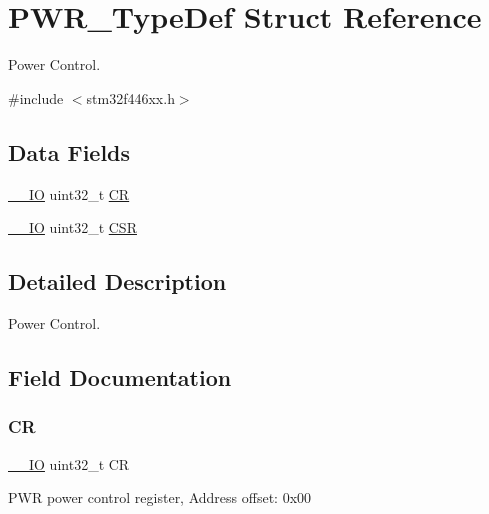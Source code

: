 \hypertarget{struct_p_w_r___type_def}{}\section{P\+W\+R\+\_\+\+Type\+Def Struct Reference}
\label{struct_p_w_r___type_def}


Power Control.  




{\ttfamily \#include $<$stm32f446xx.\+h$>$}

\subsection*{Data Fields}
\begin{DoxyCompactItemize}
\item 
\mbox{\hyperlink{core__sc300_8h_aec43007d9998a0a0e01faede4133d6be}{\+\_\+\+\_\+\+IO}} uint32\+\_\+t \mbox{\hyperlink{struct_p_w_r___type_def_ab40c89c59391aaa9d9a8ec011dd0907a}{CR}}
\item 
\mbox{\hyperlink{core__sc300_8h_aec43007d9998a0a0e01faede4133d6be}{\+\_\+\+\_\+\+IO}} uint32\+\_\+t \mbox{\hyperlink{struct_p_w_r___type_def_a876dd0a8546697065f406b7543e27af2}{C\+SR}}
\end{DoxyCompactItemize}


\subsection{Detailed Description}
Power Control. 

\subsection{Field Documentation}
\mbox{\label{struct_p_w_r___type_def_ab40c89c59391aaa9d9a8ec011dd0907a}} 
\subsubsection{\texorpdfstring{CR}{CR}}
{\footnotesize\ttfamily \mbox{\hyperlink{core__sc300_8h_aec43007d9998a0a0e01faede4133d6be}{\+\_\+\+\_\+\+IO}} uint32\+\_\+t CR}

P\+WR power control register, Address offset\+: 0x00 \mbox{\label{struct_p_w_r___type_def_a876dd0a8546697065f406b7543e27af2}} 
